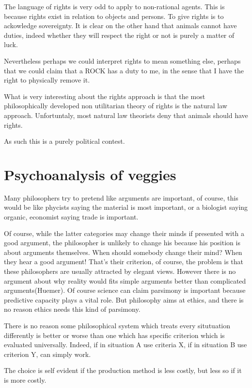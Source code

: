 \documentclass[12pt]{report}
\numberwithin{equation}{section}
\begin{document}
The language of rights is very odd to apply to non-rational agents. This is because rights exist in relation to objects and persons\cite{Midgley1983}. To give rights is to ackowledge sovereignty. It is clear on the other hand that animals cannot have duties, indeed whether they will respect the right or not is purely a matter of luck. 

Nevertheless perhaps we could interpret rights to mean something else, perhaps that we could claim that a ROCK has a duty to me, in the sense that I have the right to physically remove it. 

What is very interesting about the rights approach is that the most philosophically developed non utilitarian theory of rights is the natural law approach. Unfortuntaly, most natural law theorists deny that animals should have rights. 

As such this is a purely political contest. 

\section{Psychoanalysis of veggies}

Many philosophers try to pretend like arguments are important, of course, this would be like phycists saying the material is most important, or a biologist saying organic, economist saying trade is important. 

Of course, while the latter categories may change their minds if presented with a good argument, the philosopher is unlikely to change his because his position is about arguments themselves. When should somebody change their mind? When they hear a good argument! That's their criterion, of course, the problem is that these philosophers are usually attracted by elegant views. However there is no argument about why reality would fits simple arguments better than complicated arguments(Huemer). Of course science can claim parsimony is important because predictive capacity plays a vital role. But philosophy aims at ethics, and there is no reason ethics needs this kind of parsimony. 

There is no reason some philosophical system which treats every situtuation differently is better or worse than one which has specific criterion which is evaluated universally. Indeed, if in situation A use criteria X, if in situation B use criterion Y, can simply work. 


The choice is self evident if the production method is less costly, but less so if it is more costly. 
\end{document}
